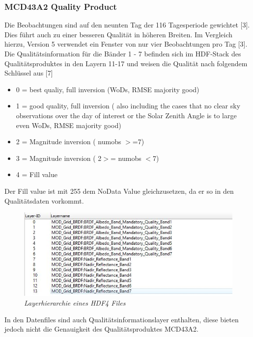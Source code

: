 \documentclass[11pt]{report}
\begin{document}
\subsubsection{MCD43A2 Quality Product} \label{MCD43A2_qualy_desc}
Die Beobachtungen sind auf den neunten Tag der 116 Tagesperiode gewichtet [3]. Dies führt auch zu einer besseren Qualität in höheren Breiten. Im Vergleich hierzu, Version 5 verwendet ein Fenster von nur vier Beobachtungen pro Tag [3]. Die Qualitätsinformation für die Bänder 1 - 7 befinden sich im HDF-Stack des Qualitätsproduktes in den Layern 11-17 und weisen die Qualität nach folgendem Schlüssel aus [7]
\begin{itemize}
\item 0 = best qualiy, full inversion (WoDs, RMSE majority good)
\item 1 = good quality, full inversion ( also including the cases that no clear sky observations over the day of interest or the Solar Zenith Angle is to large even WoDs, RMSE majority good)
\item 2 = Magnitude inversion ( numobs $>$=7)
\item 3 = Magnitude inversion ( 2$>$= numobs $<$7)
\item 4 = Fill value
\end{itemize}
Der Fill value ist mit 255 dem NoData Value gleichzusetzen, da er so in den Qualitätsdaten vorkommt. 
\begin{figure}[H]
\centering
\includegraphics{./Grafiken/Datenakquisition/HDF5_MCD4A4_Layerhierarchy.JPG}
\caption{\textit{Layerhierarchie eines HDF4 Files}}
\end{figure}
In den Datenfiles sind auch Qualitätsinformationslayer enthalten, diese bieten jedoch nicht die Genauigkeit des Qualitätsproduktes MCD43A2. 
\end{document}
